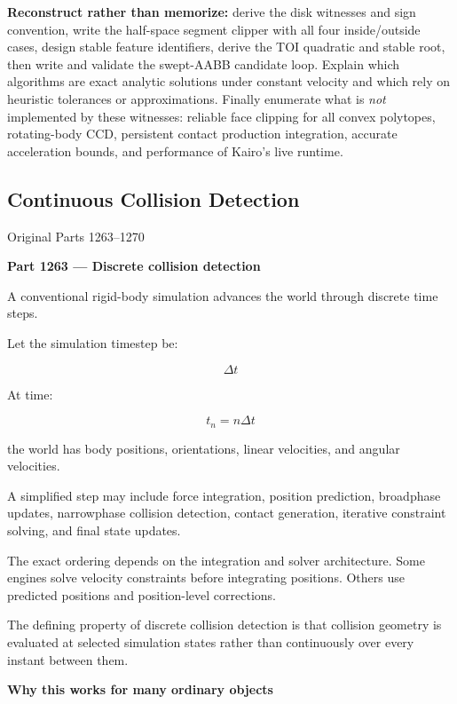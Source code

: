\textbf{Reconstruct rather than memorize:} derive the disk witnesses and sign convention, write the half-space segment clipper with all four inside/outside cases, design stable feature identifiers, derive the TOI quadratic and stable root, then write and validate the swept-AABB candidate loop. Explain which algorithms are exact analytic solutions under constant velocity and which rely on heuristic tolerances or approximations. Finally enumerate what is \emph{not} implemented by these witnesses: reliable face clipping for all convex polytopes, rotating-body CCD, persistent contact production integration, accurate acceleration bounds, and performance of Kairo's live runtime.

\subsection{Continuous Collision Detection}\label{04-visual-computing-ii-ch026-continuous-collision-detection}

\hypertarget{04-visual-computing-ii-ch026-continuous-collision-detection}{}

Original Parts 1263--1270

\textbf{Part 1263 --- Discrete collision detection}

A conventional rigid-body simulation advances the world through discrete time steps.

Let the simulation timestep be:

\[
\Delta t
\]

At time:

\[
t_n=n\Delta t
\]

the world has body positions, orientations, linear velocities, and angular velocities.

A simplified step may include force integration, position prediction, broadphase updates, narrowphase collision detection, contact generation, iterative constraint solving, and final state updates.

The exact ordering depends on the integration and solver architecture. Some engines solve velocity constraints before integrating positions. Others use predicted positions and position-level corrections.

The defining property of discrete collision detection is that collision geometry is evaluated at selected simulation states rather than continuously over every instant between them.

\textbf{Why this works for many ordinary objects}

